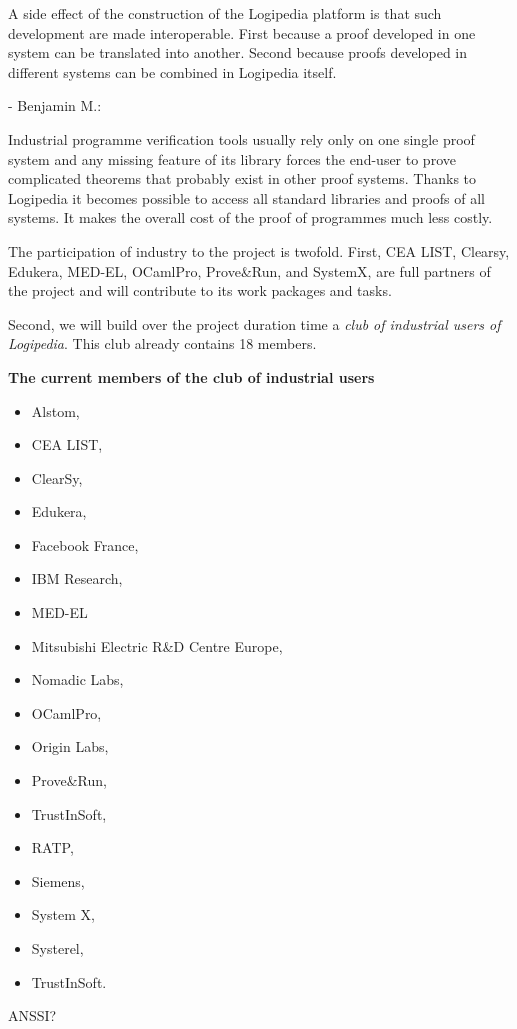 \begin{enumerate}
A side effect of the construction of the Logipedia platform is
that such development are made interoperable. First because a proof
developed in one system can be translated into another. Second because
proofs developed in different systems can be combined in 
Logipedia itself.

- {\color{red} Benjamin M.}:

Industrial programme verification tools usually rely only on one single
proof system and any missing feature of its library forces the
end-user to prove complicated theorems that probably exist in other
proof systems. Thanks to Logipedia it becomes possible to access all
standard libraries and proofs of all systems. It makes the overall
cost of the proof of programmes much less costly.

\end{enumerate}

The participation of industry to the project is twofold.
First, CEA LIST, Clearsy, Edukera, MED-EL, OCamlPro, Prove\&Run, and
SystemX, are full partners of the project and will contribute to its
work packages and tasks.

Second, we will build over the project duration time a {\em club of
  industrial users of Logipedia}. This club already contains
18 members.

\begin{framed}
\begin{center}
  {\bf \Large The current members of the club of industrial users}
\end{center}
\begin{itemize}
\item Alstom,
\item CEA LIST,
\item ClearSy,
\item Edukera,
\item Facebook France,
\item IBM Research,
\item MED-EL
\item Mitsubishi Electric R\&D Centre Europe,
\item Nomadic Labs,
\item OCamlPro,
\item Origin Labs,
\item Prove\&Run,
\item TrustInSoft,
\item RATP,
\item Siemens,
\item System X,
\item Systerel,
\item TrustInSoft.
\end{itemize}

ANSSI?

\end{framed}

